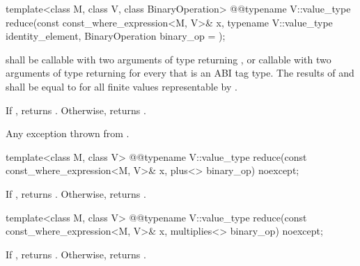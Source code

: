 \begin{itemdecl}
template<class M, class V, class BinaryOperation>
  @@typename V::value_type reduce(const const_where_expression<M, V>& x,
                                typename V::value_type identity_element,
                                BinaryOperation binary_op = {});
\end{itemdecl}

\begin{itemdescr}
  \pnum\requires
   shall be callable with two arguments of type  returning , or callable with two arguments of type  returning  for every  that is an ABI tag type. The results of  and  shall be equal to  for all finite values  representable by .

  \pnum\returns
  If , returns . Otherwise, returns  \forallmaskedi.

  \pnum\throws
  Any exception thrown from .
\end{itemdescr}

\begin{itemdecl}
template<class M, class V>
  @@typename V::value_type reduce(const const_where_expression<M, V>& x, plus<> binary_op) noexcept;
\end{itemdecl}

\begin{itemdescr}
  \pnum\returns
  If , returns . Otherwise, returns  \forallmaskedi.
\end{itemdescr}

\begin{itemdecl}
template<class M, class V>
  @@typename V::value_type reduce(const const_where_expression<M, V>& x, multiplies<> binary_op) noexcept;
\end{itemdecl}

\begin{itemdescr}
  \pnum\returns
  If , returns . Otherwise, returns  \forallmaskedi.
\end{itemdescr}

